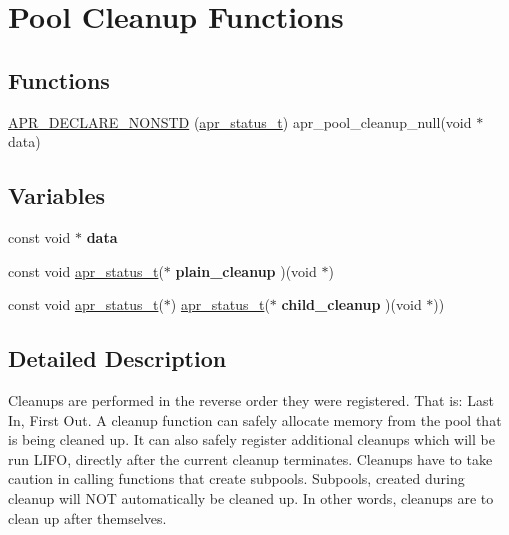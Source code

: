 \hypertarget{group___pool_cleanup}{}\section{Pool Cleanup Functions}
\label{group___pool_cleanup}
\subsection*{Functions}
\begin{DoxyCompactItemize}
\item 
\mbox{\hyperlink{group___pool_cleanup_ga18235426bac93f23261221f9b3733bfd}{A\+P\+R\+\_\+\+D\+E\+C\+L\+A\+R\+E\+\_\+\+N\+O\+N\+S\+TD}} (\mbox{\hyperlink{group__apr__errno_gaf76ee4543247e9fb3f3546203e590a6c}{apr\+\_\+status\+\_\+t}}) apr\+\_\+pool\+\_\+cleanup\+\_\+null(void $\ast$data)
\end{DoxyCompactItemize}
\subsection*{Variables}
\begin{DoxyCompactItemize}
\item 
\mbox{\label{group___pool_cleanup_ga735984d41155bc1032e09bece8f8d66d}} 
const void $\ast$ {\bfseries data}
\item 
\mbox{\label{group___pool_cleanup_ga329cbf0c5d8e0c61c40f78cdf67d4471}} 
const void \mbox{\hyperlink{group__apr__errno_gaf76ee4543247e9fb3f3546203e590a6c}{apr\+\_\+status\+\_\+t}}($\ast$ {\bfseries plain\+\_\+cleanup} )(void $\ast$)
\item 
\mbox{\label{group___pool_cleanup_ga5b82f9699d8aa32f293f26d54f813706}} 
const void \mbox{\hyperlink{group__apr__errno_gaf76ee4543247e9fb3f3546203e590a6c}{apr\+\_\+status\+\_\+t}}($\ast$) \mbox{\hyperlink{group__apr__errno_gaf76ee4543247e9fb3f3546203e590a6c}{apr\+\_\+status\+\_\+t}}($\ast$ {\bfseries child\+\_\+cleanup} )(void $\ast$))
\end{DoxyCompactItemize}


\subsection{Detailed Description}
Cleanups are performed in the reverse order they were registered. That is\+: Last In, First Out. A cleanup function can safely allocate memory from the pool that is being cleaned up. It can also safely register additional cleanups which will be run L\+I\+FO, directly after the current cleanup terminates. Cleanups have to take caution in calling functions that create subpools. Subpools, created during cleanup will N\+OT automatically be cleaned up. In other words, cleanups are to clean up after themselves. 

